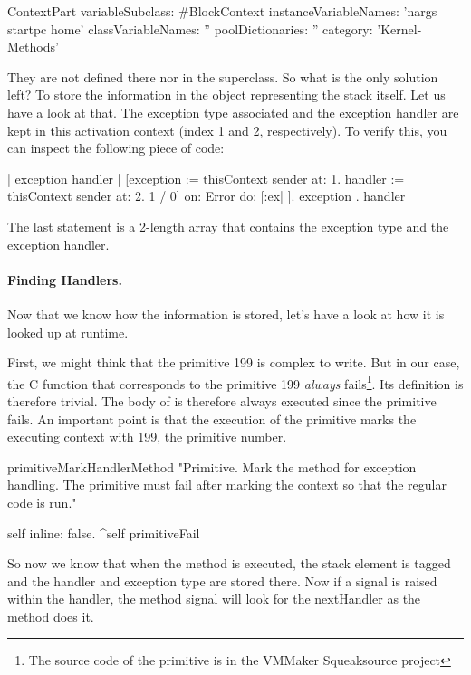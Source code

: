 \documentclass[a4paper,10pt,twoside]{book}
\begin{document}
\begin{code}{}
ContextPart variableSubclass: #BlockContext
	instanceVariableNames: 'nargs startpc home'
	classVariableNames: ''
	poolDictionaries: ''
	category: 'Kernel-Methods'
\end{code}

They are not defined there nor in the superclass. So what is the only solution left? To store the information in the object representing the stack itself. Let us have a look at that. The exception type associated and the exception handler are kept in this activation context (index 1 and 2, respectively). To verify this, you can inspect the following piece of code:

\begin{code}{}
| exception handler | 
[exception := thisContext sender at: 1. 
 handler := thisContext sender at: 2. 
 1 / 0] 
on: Error 
do: [:ex| ]. 
{ exception . handler } 
\end{code}

The last statement is a 2-length array that contains the exception type and the exception handler. 


\paragraph{Finding Handlers.}
Now that we know how the information is stored, let's have a look at how it is looked up at runtime. 

First, we might think that the primitive 199 is complex to write. But in our case, the C function that corresponds to the primitive 199 \emph{always} fails\footnote{The source code of the primitive is  in the VMMaker Squeaksource project}. Its definition is therefore trivial. The body of  is therefore always executed since the primitive fails. An important point is that the execution of the primitive marks the executing context with 199, the primitive number. 

\begin{code}{}
primitiveMarkHandlerMethod
     "Primitive. Mark the method for exception handling. The primitive must fail after marking the 
     context so that the regular code is run."
     
     self inline: false.
    ^self primitiveFail
\end{code}

So now we know that when the method  is executed, the stack element is tagged and the handler and exception type 
are stored there. Now if a signal is raised within the handler, the method signal will look for the nextHandler as the method 
does it.
\end{document}
